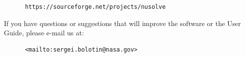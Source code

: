 \documentclass [10pt,letterpaper]{report}
\begin{document}
\begin{verbatim}
      https://sourceforge.net/projects/nusolve
\end{verbatim}

\noindent
If you have questions or suggestions that will improve the software or
the User Guide, please e-mail us at:

\begin{verbatim}
      <mailto:sergei.bolotin@nasa.gov>
\end{verbatim}



%
%
%
%
%
%
%
\end{document}
